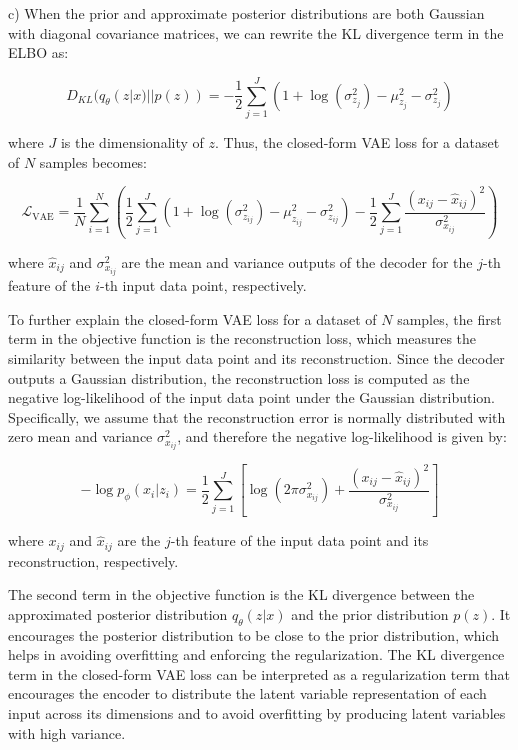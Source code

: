 \documentclass{homework}
\begin{document}
c) When the prior and approximate posterior distributions are both Gaussian with diagonal covariance matrices, we can rewrite the KL divergence term in the ELBO as:

$$
D_{KL}(q_\theta(z|x)||p(z)) = -\frac{1}{2} \sum_{j=1}^J \left(1 + \log(\sigma_{z_j}^2) - \mu_{z_j}^2 - \sigma_{z_j}^2 \right)
$$

where $J$ is the dimensionality of $z$. Thus, the closed-form VAE loss for a dataset of $N$ samples becomes:

$$
\mathcal{L}_{\text{VAE}} = \frac{1}{N} \sum_{i=1}^N \left(\frac{1}{2}\sum_{j=1}^J \left(1 + \log(\sigma_{z_{ij}}^2) - \mu_{z_{ij}}^2 - \sigma_{z_{ij}}^2\right) - \frac{1}{2} \sum_{j=1}^J \frac{(x_{ij} - \hat{x}_{ij})^2}{\sigma_{x_{ij}}^2}\right)
$$

where $\hat{x}_{ij}$ and $\sigma_{x_{ij}}^2$ are the mean and variance outputs of the decoder for the $j$-th feature of the $i$-th input data point, respectively.

To further explain the closed-form VAE loss for a dataset of $N$ samples, the first term in the objective function is the reconstruction loss, which measures the similarity between the input data point and its reconstruction. Since the decoder outputs a Gaussian distribution, the reconstruction loss is computed as the negative log-likelihood of the input data point under the Gaussian distribution. Specifically, we assume that the reconstruction error is normally distributed with zero mean and variance $\sigma_{x_{ij}}^2$, and therefore the negative log-likelihood is given by:

$$
-\log p_\phi(x_{i}|z_{i}) = \frac{1}{2} \sum_{j=1}^J \left[\log(2\pi\sigma_{x_{ij}}^2) + \frac{(x_{ij} - \hat{x}_{ij})^2}{\sigma_{x_{ij}}^2} \right]
$$

where $x_{ij}$ and $\hat{x}_{ij}$ are the $j$-th feature of the input data point and its reconstruction, respectively.

The second term in the objective function is the KL divergence between the approximated posterior distribution $q_\theta(z|x)$ and the prior distribution $p(z)$. It encourages the posterior distribution to be close to the prior distribution, which helps in avoiding overfitting and enforcing the regularization. The KL divergence term in the closed-form VAE loss can be interpreted as a regularization term that encourages the encoder to distribute the latent variable representation of each input across its dimensions and to avoid overfitting by producing latent variables with high variance.
\end{document}

